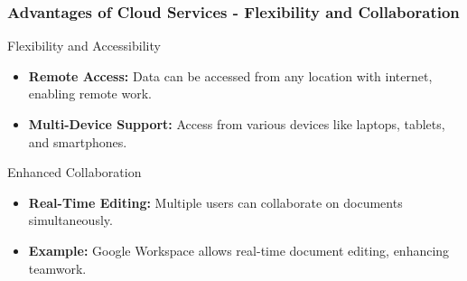\documentclass{beamer}
\begin{document}
\begin{frame}[fragile]
    \frametitle{Advantages of Cloud Services - Flexibility and Collaboration}
    \begin{block}{Flexibility and Accessibility}
        \begin{itemize}
            \item \textbf{Remote Access:} Data can be accessed from any location with internet, enabling remote work.
            \item \textbf{Multi-Device Support:} Access from various devices like laptops, tablets, and smartphones.
        \end{itemize}
    \end{block}

    \begin{block}{Enhanced Collaboration}
        \begin{itemize}
            \item \textbf{Real-Time Editing:} Multiple users can collaborate on documents simultaneously.
            \item \textbf{Example:} Google Workspace allows real-time document editing, enhancing teamwork.
        \end{itemize}
    \end{block}
\end{frame}
\end{document}
